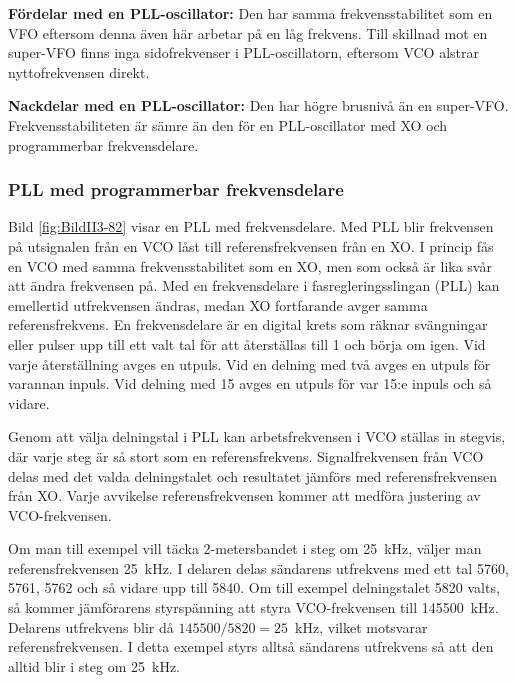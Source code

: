 \textbf{Fördelar med en PLL-oscillator:}
Den har samma frekvensstabilitet som en VFO eftersom denna även här arbetar på
en låg frekvens.
Till skillnad mot en super-VFO finns inga sidofrekvenser i PLL-oscillatorn,
eftersom VCO alstrar nyttofrekvensen direkt.

\textbf{Nackdelar med en PLL-oscillator:}
Den har högre brusnivå än en super-VFO.
Frekvensstabiliteten är sämre än den för en PLL-oscillator med XO och
programmerbar frekvensdelare.

\subsubsection{PLL med programmerbar frekvensdelare}


Bild \ref{fig:BildII3-82} visar en PLL med frekvensdelare.
Med PLL blir frekvensen på utsignalen från en VCO låst till referensfrekvensen 
från en XO.
I princip fås en VCO med samma frekvensstabilitet som en XO, men som också är 
lika svår att ändra frekvensen på.
Med en frekvensdelare i fasregleringsslingan (PLL) kan emellertid utfrekvensen
ändras, medan XO fortfarande avger samma referensfrekvens.
En frekvensdelare är en digital krets som räknar svängningar eller pulser upp
till ett valt tal för att återställas till 1 och börja om igen.
Vid varje återställning avges en utpuls.
Vid en delning med två avges en utpuls för varannan inpuls.
Vid delning med 15 avges en utpuls för var 15:e inpuls och så vidare.

Genom att välja delningstal i PLL kan arbetsfrekvensen i VCO ställas
in stegvis, där varje steg är så stort som en referensfrekvens.
Signalfrekvensen från VCO delas med det valda delningstalet och resultatet
jämförs med referensfrekvensen från XO.
Varje avvikelse referensfrekvensen kommer att medföra justering av 
VCO-frekvensen.

Om man till exempel vill täcka 2-metersbandet i steg om 25~kHz, väljer man
referensfrekvensen 25~kHz. I delaren delas sändarens utfrekvens med ett tal 
5760, 5761, 5762 och så vidare upp till 5840.
Om till exempel delningstalet 5820 valts, så kommer jämförarens styrspänning 
att styra VCO-frekvensen till 145500~kHz.
Delarens utfrekvens blir då \(145500/5820 = 25\)~kHz, vilket motsvarar
referensfrekvensen.
I detta exempel styrs alltså sändarens utfrekvens så att den alltid blir i steg
om 25~kHz.

